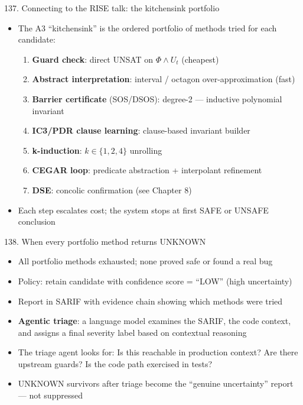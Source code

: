 \documentclass[aspectratio=169]{beamer}
\begin{document}
\begin{frame}{137. Connecting to the RISE talk: the kitchensink portfolio}
\begin{itemize}
  \item The A3 ``kitchensink'' is the ordered portfolio of methods tried for each candidate:
  \begin{enumerate}
    \item \textbf{Guard check}: direct UNSAT on \(\Phi \wedge U_t\) (cheapest)
    \item \textbf{Abstract interpretation}: interval / octagon over-approximation (fast)
    \item \textbf{Barrier certificate} (SOS/DSOS): degree-2 --- inductive polynomial invariant
    \item \textbf{IC3/PDR clause learning}: clause-based invariant builder
    \item \textbf{k-induction}: \(k\in\{1,2,4\}\) unrolling
    \item \textbf{CEGAR loop}: predicate abstraction + interpolant refinement
    \item \textbf{DSE}: concolic confirmation (see Chapter 8)
  \end{enumerate}
  \item Each step escalates cost; the system stops at first SAFE or UNSAFE conclusion
\end{itemize}
\end{frame}

\begin{frame}{138. When every portfolio method returns UNKNOWN}
\begin{itemize}
  \item All portfolio methods exhausted; none proved safe or found a real bug
  \item Policy: retain candidate with confidence score = ``LOW'' (high uncertainty)
  \item Report in SARIF with evidence chain showing which methods were tried
  \item \textbf{Agentic triage}: a language model examines the SARIF, the code context, and assigns a final
    severity label based on contextual reasoning
  \item The triage agent looks for: Is this reachable in production context? Are there upstream guards?
    Is the code path exercised in tests?
  \item UNKNOWN survivors after triage become the ``genuine uncertainty'' report --- not suppressed
\end{itemize}
\end{frame}
\end{document}
